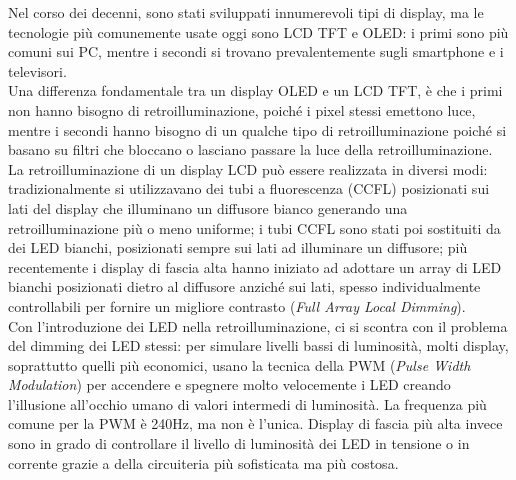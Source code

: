 Nel corso dei decenni, sono stati sviluppati innumerevoli tipi di display, ma le tecnologie più comunemente usate oggi sono LCD TFT e OLED: i primi sono più comuni sui PC, mentre i secondi si trovano prevalentemente sugli smartphone e i televisori.\\
Una differenza fondamentale tra un display OLED e un LCD TFT, è che i primi non hanno bisogno di retroilluminazione, poiché i pixel stessi emettono luce, mentre i secondi hanno bisogno di un qualche tipo di retroilluminazione poiché si basano su filtri che bloccano o lasciano passare la luce della retroilluminazione.\\
La retroilluminazione di un display LCD può essere realizzata in diversi modi: tradizionalmente si utilizzavano dei tubi a fluorescenza (CCFL) posizionati sui lati del display che illuminano un diffusore bianco generando una retroilluminazione più o meno uniforme; i tubi CCFL sono stati poi sostituiti da dei LED bianchi, posizionati sempre sui lati ad illuminare un diffusore; più recentemente i display di fascia alta hanno iniziato ad adottare un array di LED bianchi posizionati dietro al diffusore anziché sui lati, spesso individualmente controllabili per fornire un migliore contrasto (\textit{Full Array Local Dimming}).\\
Con l'introduzione dei LED nella retroilluminazione, ci si scontra con il problema del dimming dei LED stessi: per simulare livelli bassi di luminosità, molti display, soprattutto quelli più economici, usano la tecnica della PWM (\textit{Pulse Width Modulation}) per accendere e spegnere molto velocemente i LED creando l'illusione all'occhio umano di valori intermedi di luminosità. La frequenza più comune per la PWM è 240Hz, ma non è l'unica. Display di fascia più alta invece sono in grado di controllare il livello di luminosità dei LED in tensione o in corrente grazie a della circuiteria più sofisticata ma più costosa.

